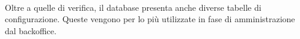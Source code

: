 \paragraph{}Oltre a quelle di verifica, il database presenta anche diverse tabelle di configurazione. Queste vengono per lo più utilizzate in fase di amministrazione dal backoffice.



